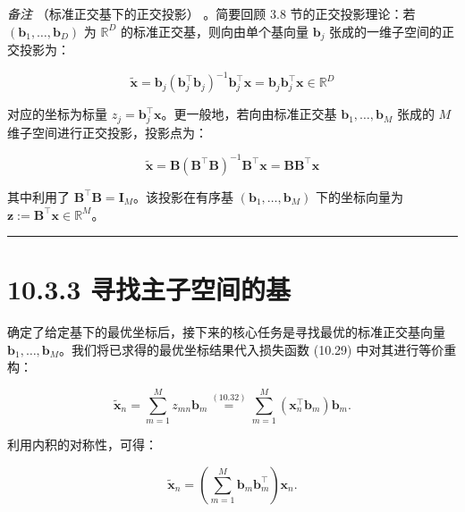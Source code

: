 \emph{备注} （标准正交基下的正交投影） 。简要回顾 3.8 节的正交投影理论：若 $ (\boldsymbol{b}_1, \ldots, \boldsymbol{b}_D) $ 为 $ \mathbb{R}^D $ 的标准正交基，则向由单个基向量 $ \boldsymbol{b}_j $ 张成的一维子空间的正交投影为：

\begin{equation}
\tilde{\boldsymbol{x}} = \boldsymbol{b}_j (\boldsymbol{b}_j^\top \boldsymbol{b}_j)^{-1}\boldsymbol{b}_j^\top \boldsymbol{x} = \boldsymbol{b}_j \boldsymbol{b}_j^\top \boldsymbol{x} \in \mathbb{R}^D
\tag{10.33}
\end{equation}

对应的坐标为标量 $ z_j = \boldsymbol{b}_j^\top \boldsymbol{x} $。更一般地，若向由标准正交基 $ \boldsymbol{b}_1, \ldots, \boldsymbol{b}_M $ 张成的 $ M $ 维子空间进行正交投影，投影点为：

\begin{equation}
\tilde{\boldsymbol{x}} = \boldsymbol{B}(\boldsymbol{B}^\top \boldsymbol{B})^{-1}\boldsymbol{B}^\top \boldsymbol{x} = \boldsymbol{B}\boldsymbol{B}^\top \boldsymbol{x}
\tag{10.34}
\end{equation}

其中利用了 $ \boldsymbol{B}^\top \boldsymbol{B} = \boldsymbol{I}_M $。该投影在有序基 $ (\boldsymbol{b}_1, \ldots, \boldsymbol{b}_M) $ 下的坐标向量为 $ \boldsymbol{z} := \boldsymbol{B}^\top \boldsymbol{x} \in \mathbb{R}^M $。

\medskip\hrule\medskip

\section*{10.3.3 寻找主子空间的基}

确定了给定基下的最优坐标后，接下来的核心任务是寻找最优的标准正交基向量 $ \boldsymbol{b}_1, \ldots, \boldsymbol{b}_M $。我们将已求得的最优坐标结果代入损失函数 (10.29) 中对其进行等价重构：

\begin{equation}
\tilde{\boldsymbol{x}}_n = \sum_{m=1}^M z_{mn}\boldsymbol{b}_m \overset{(10.32)}{=} \sum_{m=1}^M (\boldsymbol{x}_n^\top \boldsymbol{b}_m)\boldsymbol{b}_m .
\tag{10.35}
\end{equation}

利用内积的对称性，可得：

\begin{equation}
\tilde{\boldsymbol{x}}_n = \left( \sum_{m=1}^M \boldsymbol{b}_m \boldsymbol{b}_m^\top \right) \boldsymbol{x}_n .
\tag{10.36}
\end{equation}

